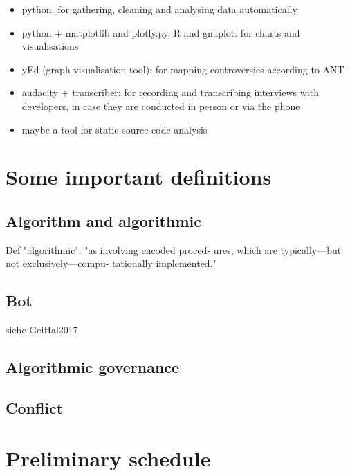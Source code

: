 \documentclass[pdftex,a4paper,11pt]{scrartcl}
\begin{document}
\begin{itemize}
    \item python: for gathering, cleaning and analysing data automatically
    \item python + matplotlib and plotly.py, R and gnuplot: for charts and visualisations
    \item yEd (graph visualisation tool): for mapping controversies according to ANT
    \item audacity + transcriber: for recording and transcribing interviews with developers, in case they are conducted in person or via the phone
    \item maybe a tool for static source code analysis
\end{itemize}

\section{Some important definitions}

\subsection{Algorithm and algorithmic}
Def "algorithmic": "as involving encoded proced-
ures, which are typically—but not exclusively—compu-
tationally implemented."~\cite{Geiger2017}

\subsection{Bot}
siehe GeiHal2017

\subsection{Algorithmic governance}

\subsection{Conflict}

\section{Preliminary schedule}
\end{document}
